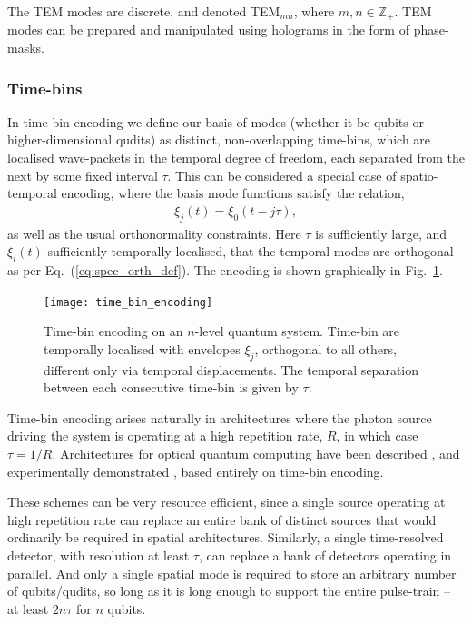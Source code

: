 The TEM modes are discrete, and denoted TEM$_{mn}$, where \mbox{$m,n\in \mathbb{Z}_+$}. TEM modes can be prepared and manipulated using holograms in the form of phase-masks. 

%
%

\subsubsection{Time-bins} \label{sec:time_bin} 

In time-bin encoding we define our basis of modes (whether it be qubits or higher-dimensional qudits) as distinct, non-overlapping time-bins, which are localised wave-packets in the temporal degree of freedom, each separated from the next by some fixed interval $\tau$. This can be considered a special case of spatio-temporal encoding, where the basis mode functions satisfy the relation,
\begin{align}
\xi_{j}(t) = \xi_0(t-j\tau),
\end{align}
as well as the usual orthonormality constraints. Here $\tau$ is sufficiently large, and $\xi_i(t)$ sufficiently temporally localised, that the temporal modes are orthogonal as per Eq.~(\ref{eq:spec_orth_def}). The encoding is shown graphically in Fig.~\ref{fig:time_bin_encoding}.

\begin{figure}[!htbp]
\texttt{[image: time\_bin\_encoding]}
\captionspacefig \caption{Time-bin encoding on an $n$-level quantum system. Time-bin are temporally localised with envelopes $\xi_j$, orthogonal to all others, different only via temporal displacements. The temporal separation between each consecutive time-bin is given by $\tau$.}\label{fig:time_bin_encoding}	
\end{figure}

Time-bin encoding arises naturally in architectures where the photon source driving the system is operating at a high repetition rate, $R$, in which case \mbox{$\tau=1/R$}. Architectures for optical quantum computing have been described \cite{bib:RohdeLoop15, bib:RohdeUnivLoop15}, and experimentally demonstrated \cite{???}, based entirely on time-bin encoding.

These schemes can be very resource efficient, since a single source operating at high repetition rate can replace an entire bank of distinct sources that would ordinarily be required in spatial architectures. Similarly, a single time-resolved detector, with resolution at least $\tau$, can replace a bank of detectors operating in parallel. And only a single spatial mode is required to store an arbitrary number of qubits/qudits, so long as it is long enough to support the entire pulse-train -- at least $2n\tau$ for $n$ qubits.

